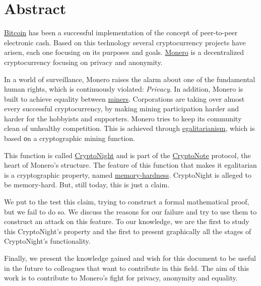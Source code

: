 %
%
\restoregeometry

\thispagestyle{empty}
\chapter*{Abstract}
\hyperref[sec:Bitcoin]{Bitcoin} has been a successful implementation of the concept of peer-to-peer electronic cash. Based on this technology several cryptocurrency projects have arisen, each one focusing on its purposes and goals. \hyperref[sec:Monero]{Monero} is a decentralized cryptocurrency focusing on privacy and anonymity.

In a world of surveillance, Monero raises the alarm about one of the fundamental human rights, which is continuously violated: \emph{Privacy}. In addition, Monero is built to achieve equality between \hyperref[sec:mining]{miners}. Corporations are taking over almost every successful cryptocurrency, by making mining participation harder and harder for the hobbyists and supporters. Monero tries to keep its community clean of unhealthy competition. This is achieved through \hyperref[sec:egalitarian]{egalitarianism}, which is based οn a cryptographic mining function.

This function is called \hyperref[ch:cryptonight]{CryptoNight} and is part of the \hyperref[sec:CryptoNote]{CryptoNote} protocol, the heart of Monero's structure. The feature of this function that makes it egalitarian is a cryptographic property, named \hyperref[sec:memory-hard]{memory-hardness}. CryptoNight is alleged to be memory-hard. But, still today, this is just a claim.

We put to the test this claim, trying to construct a formal mathematical proof, but we fail to do so. We discuss the reasons for our failure and try to use them to construct an attack on this feature. To our knowledge, we are the first to study this CryptoNight's property and the first to present graphically all the stages of CryptoNight's functionality.

Finally, we present the knowledge gained and wish for this document to be useful in the future to colleagues that want to contribute in this field. The aim of this work is to contribute to Monero's fight for privacy, anonymity and equality.
\clearpage
%
%
\thispagestyle{empty}
\null
\clearpage
